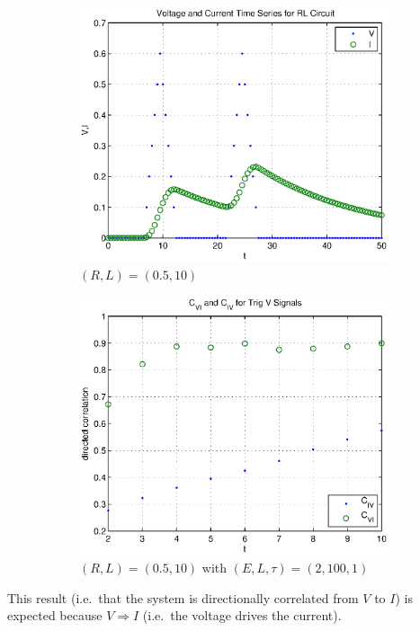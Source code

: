 \documentclass[a4paper,11pt]{article}
\begin{document}
\begin{figure}[h!t]
\centering
\begin{subfigure}[b]{0.4\textwidth}
\label{fig:RL_trigsignals}
\includegraphics[scale=0.55]{RL_trigsignals.eps}
\caption{$(R,L) = (0.5,10)$}
\end{subfigure}
\begin{subfigure}[b]{0.4\textwidth}
\label{fig:RL_trigsignalsCCM}
\includegraphics[scale=0.55]{RL_trigsignalsCCM.eps}
\caption{$(R,L) = (0.5,10)$ with $\left(E,L,\tau\right)=\left(2,100,1\right)$}
\end{subfigure}
\caption{}
\end{figure}
This result (i.e.\ that the system is directionally correlated from $V$ to $I$) is expected because $V\Rightarrow I$ (i.e.\ the voltage drives the current).
\end{document}
